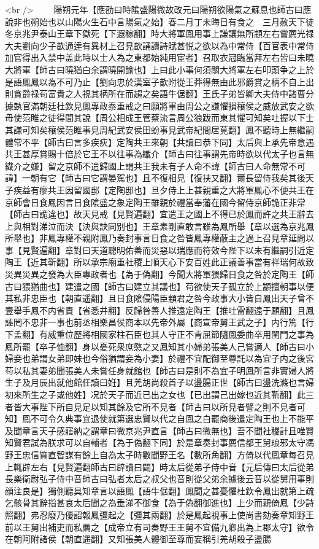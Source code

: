 <br />
　　陽朔元年【應劭曰時隂盛陽微故改元曰陽朔欲陽氣之蘇息也師古曰應說非也朔始也以山陽火生石中言陽氣之始】春二月丁未晦日有食之　三月赦天下徒　冬京兆尹泰山王章下獄死【下遐稼翻】時大將軍鳳用事上謙讓無所顓左右嘗薦光禄大夫劉向少子歆通逹有異材上召見歆誦讀詩賦甚悦之欲以為中常侍【百官表中常侍加官得出入禁中盖此時以士人為之東都始純用宦者】召取衣冠臨當拜左右皆曰未曉大將軍【師古曰曉猶白余謂曉開諭也】上曰此小事何須關大將軍左右叩頭争之上於是語鳳鳳以為不可乃止【劉向忠於漢室子歆附從王莽得無由此邪爵賞之柄不自上出則貪爵禄苟富貴之人視其柄所在而趨之矣語牛倨翻】王氏子弟皆卿大夫侍中諸曹分據埶官滿朝廷杜欽見鳳專政泰重戒之曰願將軍由周公之謙懼損穰侯之威放武安之欲毋使范睢之徒得間其說【周公相成王管蔡流言周公狼跋而東其懼可知矣吐握以下士其謙可知矣穰侯范睢事見周紀武安侯田蚡事見武帝紀間居莧翻】鳳不聽時上無繼嗣體常不平【師古曰言多疾疢】定陶共王來朝【共讀曰恭下同】太后與上承先帝意遇共王甚厚賞賜十倍於它王不以往事為纎介【師古曰往事謂先帝時欲以代太子也言無纎介之嫌】留之京師不遣歸國上謂共王我未有子人命不諱【師古曰人命無常不可諱】一朝有它【師古曰它謂晏駕也】且不復相見【復扶又翻】爾長留侍我矣其後天子疾益有瘳共王因留國邸【定陶邸也】旦夕侍上上甚親重之大將軍鳳心不便共王在京師會日食鳳因言日食隂盛之象定陶王雖親於禮當奉藩在國今留侍京師詭正非常【師古曰詭違也】故天見戒【見賢遍翻】宜遣王之國上不得已於鳳而許之共王辭去上與相對涕泣而決【決與訣同别也】王章素剛直敢言雖為鳳所舉【章以選為京兆鳳所舉也】非鳳專權不親附鳳乃奏封事言日食之咎皆鳳專權蔽主之過上召見章延問以事【見賢遍翻】章對曰天道聰明佑善而災惡以瑞應而符效今陛下以未有繼嗣引近定陶王【近其靳翻】所以承宗廟重社稷上順天心下安百姓此正議善事當有祥瑞何故致災異災異之發為大臣專政者也【為于偽翻】今聞大將軍猥歸日食之咎於定陶王【師古曰猥猶曲也】建遣之國【師古曰建立其議也】苟欲使天子孤立於上顓擅朝事以便其私非忠臣也【朝直遥翻】且日食隂侵陽臣顓君之咎今政事大小皆自鳳出天子曾不壹舉手鳳不内省責【省悉井翻】反歸咎善人推遠定陶王【推吐雷翻遠于願翻】且鳳誣罔不忠非一事也前丞相樂昌侯商本以先帝外屬【商宣帝舅王武之子】内行篤【行下孟翻】有威重位歷將相國家柱石臣也其人守正不肯屈節隨鳳委曲卒用閨門之事為鳳所罷【卒子恤翻】身以憂死衆庶愍之又鳳知其小婦弟張美人己嘗適人【師古曰小婦妾也弟謂女弟即妹也今俗猶謂妾為小妻】於禮不宜配御至尊託以為宜子内之後宮苟以私其妻弟聞張美人未嘗任身就館也【師古曰是則不為宜子明鳳所言非實婦人將生子及月辰出就他館任讀曰姙】且羌胡尚殺首子以盪腸正世【師古曰盪洗滌也言婦初來所生之子或他姓】况於天子而近已出之女也【已出謂己出嫁也近其靳翻】此三者皆大事陛下所自見足以知其餘及它所不見者【師古曰以所見者譬之則不見者可知】鳳不可令久典事宜退使就第選忠賢以代之自鳳之白罷商後遣定陶王也上不能平及聞章言天子感寤納之謂章曰微京兆尹直言【師古曰微無也】吾不聞社稷計且唯賢知賢君試為朕求可以自輔者【為于偽翻下同】於是章奏封事薦信都王舅琅邪太守馮野王忠信質直智謀有餘上自為太子時數聞野王名【數所角翻】方倚以代鳳章每召見上輒辟左右【見賢遍翻師古曰辟讀曰闢】時太后從弟子侍中音【元后傳曰太后從弟長樂衛尉弘子侍中音師古曰弘者太后之叔父也音則從父弟余據後云音以從舅用事則顔注良是】獨側聽具知章言以語鳳【語牛倨翻】鳳聞之甚憂懼杜欽令鳳出就第上疏乞骸骨其辭指甚哀太后聞之為垂涕不御食【為于偽翻御進也】上少而親倚鳳【少詩照翻】弗忍廢乃優詔報鳳彊起之【彊其兩翻】於是鳳起視事上使尚書劾奏章知野王前以王舅出補吏而私薦之【成帝立有司奏野王王舅不宜備九卿出為上郡太守】欲令在朝阿附諸侯【朝直遥翻】又知張美人體御至尊而妄稱引羌胡殺子盪腸